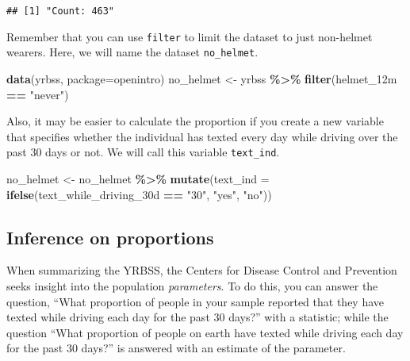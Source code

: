 \documentclass[
]{article}
\newenvironment{Shaded}{\begin{snugshade}}{\end{snugshade}}
\newcommand{\AttributeTok}[1]{\textcolor[rgb]{0.13,0.29,0.53}{#1}}
\newcommand{\FunctionTok}[1]{\textcolor[rgb]{0.13,0.29,0.53}{\textbf{#1}}}
\newcommand{\NormalTok}[1]{#1}
\newcommand{\OtherTok}[1]{\textcolor[rgb]{0.56,0.35,0.01}{#1}}
\newcommand{\SpecialCharTok}[1]{\textcolor[rgb]{0.81,0.36,0.00}{\textbf{#1}}}
\newcommand{\StringTok}[1]{\textcolor[rgb]{0.31,0.60,0.02}{#1}}
\begin{document}
\begin{verbatim}
## [1] "Count: 463"
\end{verbatim}

Remember that you can use \texttt{filter} to limit the dataset to just
non-helmet wearers. Here, we will name the dataset \texttt{no\_helmet}.

\begin{Shaded}
\begin{Highlighting}[]
\FunctionTok{data}\NormalTok{(}\StringTok{\textquotesingle{}yrbss\textquotesingle{}}\NormalTok{, }\AttributeTok{package=}\StringTok{\textquotesingle{}openintro\textquotesingle{}}\NormalTok{)}
\NormalTok{no\_helmet }\OtherTok{\textless{}{-}}\NormalTok{ yrbss }\SpecialCharTok{\%\textgreater{}\%}
  \FunctionTok{filter}\NormalTok{(helmet\_12m }\SpecialCharTok{==} \StringTok{"never"}\NormalTok{)}
\end{Highlighting}
\end{Shaded}

Also, it may be easier to calculate the proportion if you create a new
variable that specifies whether the individual has texted every day
while driving over the past 30 days or not. We will call this variable
\texttt{text\_ind}.

\begin{Shaded}
\begin{Highlighting}[]
\NormalTok{no\_helmet }\OtherTok{\textless{}{-}}\NormalTok{ no\_helmet }\SpecialCharTok{\%\textgreater{}\%}
  \FunctionTok{mutate}\NormalTok{(}\AttributeTok{text\_ind =} \FunctionTok{ifelse}\NormalTok{(text\_while\_driving\_30d }\SpecialCharTok{==} \StringTok{"30"}\NormalTok{, }\StringTok{"yes"}\NormalTok{, }\StringTok{"no"}\NormalTok{))}
\end{Highlighting}
\end{Shaded}

\subsection{Inference on proportions}\label{inference-on-proportions}

When summarizing the YRBSS, the Centers for Disease Control and
Prevention seeks insight into the population \emph{parameters}. To do
this, you can answer the question, ``What proportion of people in your
sample reported that they have texted while driving each day for the
past 30 days?'' with a statistic; while the question ``What proportion
of people on earth have texted while driving each day for the past 30
days?'' is answered with an estimate of the parameter.
\end{document}
